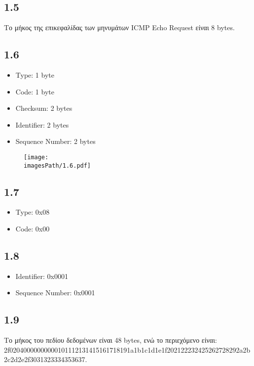 		\subsection*{1.5}
			Το μήκος της επικεφαλίδας των μηνυμάτων ICMP Echo Request είναι 8 bytes.
	
		\subsection*{1.6}
			\begin{itemize}
				\item Type: 1 byte 
				\item Code: 1 byte
				\item Checksum: 2 bytes
				\item Identifier: 2 bytes
				\item Sequence Number: 2 bytes
			\end{itemize}
			
			\begin{figure}[H]
				\texttt{[image: \\imagesPath/1.6.pdf]}
			\end{figure}
	
		\subsection*{1.7}
			\begin{itemize}
				\item Type: 0x08
				\item Code: 0x00
			\end{itemize}
	
		\subsection*{1.8}
			\begin{itemize}
				\item Identifier: 0x0001
				\item Sequence Number: 0x0001
			\end{itemize}
	
		\subsection*{1.9}
			Το μήκος του πεδίου δεδομένων είναι 48 bytes, ενώ το περιεχόμενο είναι: \\
			
			2f02040000000000101112131415161718191a1b1c1d1e1f202122232425262728292a2b2c2d2e2f3031323334353637. \\
			
